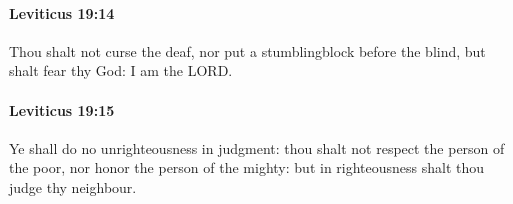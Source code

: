 		\paragraph{Leviticus 19:14} %
			\label{LEVITICUS-19-14}

			Thou shalt not curse the deaf, nor put a stumblingblock before the blind, but shalt fear thy God: I am the LORD.


		\paragraph{Leviticus 19:15} %
			\label{LEVITICUS-19-15}

			Ye shall do no unrighteousness in judgment: thou shalt not respect the person of the poor, nor honor the person of the mighty: but in righteousness shalt thou judge thy neighbour.


